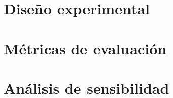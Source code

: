 \documentclass[12pt,a4paper]{report}
\begin{document}
%
%
%
%
%
%
%


\section{Diseño experimental}

%
%
%
%
%
%
%
%
%
%


\section{Métricas de evaluación}

%
%
%
%
%
%
%


\section{Análisis de sensibilidad}

%
%
%
%
%
%


\end{document}
